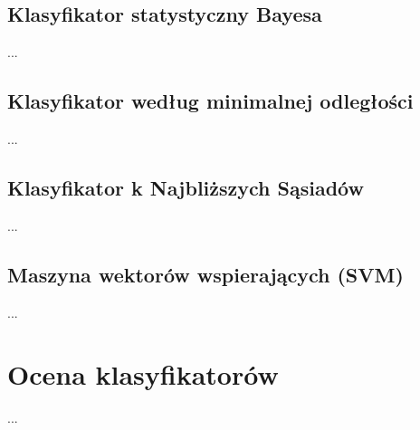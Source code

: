 \subsection{Klasyfikator statystyczny Bayesa}
...
	
\subsection{Klasyfikator według minimalnej odległości}
...
	
\subsection{Klasyfikator k Najbliższych Sąsiadów}
...

\subsection{Maszyna wektorów wspierających (SVM)}
...
	
\section{Ocena klasyfikatorów}
...
